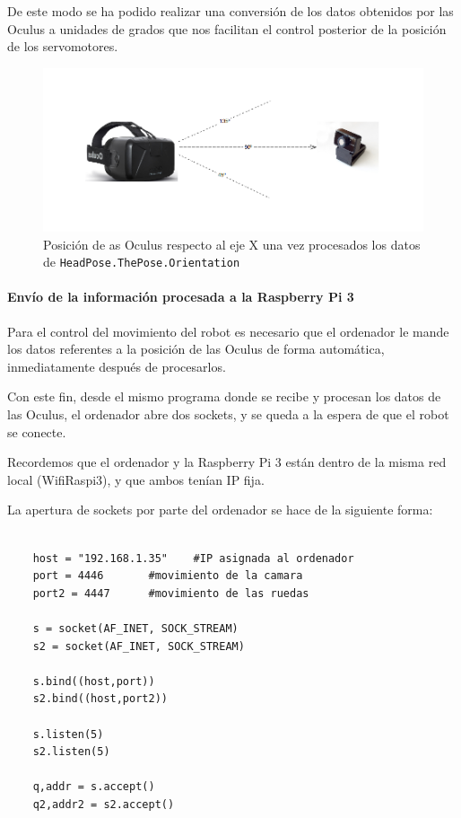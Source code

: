 \documentclass[twoside, 12pt]{epstfg}
\begin{document}
De este modo se ha podido realizar una conversión de los datos obtenidos por las Oculus a unidades de grados que nos facilitan el control posterior de la posición de los servomotores.

\begin{figure}[h!]
	\centerline{
		\mbox{\includegraphics[width=.80\textwidth]{images/Oculusgrados2.png}}
	}
	\caption{Posición de as Oculus respecto al eje X una vez procesados los datos de \texttt{HeadPose.ThePose.Orientation}}
\end{figure}
\newpage
\paragraph{Envío de la información procesada a la Raspberry Pi 3}



Para el control del movimiento del robot es necesario que el ordenador le mande los datos referentes a la posición de las Oculus de forma automática, inmediatamente después de procesarlos.

Con este fin, desde el mismo programa donde se recibe y procesan los datos de las Oculus, el ordenador abre dos sockets, y se queda a la espera de que el robot se conecte.

Recordemos que el ordenador y la Raspberry Pi 3 están dentro de la misma red local (WifiRaspi3), y que ambos tenían IP fija.

La apertura de sockets por parte del ordenador se hace de la siguiente forma:

\lstset{language=python, breaklines=true, basicstyle=\footnotesize}
\begin{lstlisting}[frame=single]

	host = "192.168.1.35"    #IP asignada al ordenador
	port = 4446       #movimiento de la camara
	port2 = 4447      #movimiento de las ruedas

	s = socket(AF_INET, SOCK_STREAM)
	s2 = socket(AF_INET, SOCK_STREAM)

	s.bind((host,port))
	s2.bind((host,port2))

	s.listen(5)
	s2.listen(5)

	q,addr = s.accept()
	q2,addr2 = s2.accept()

\end{lstlisting}
\end{document}
